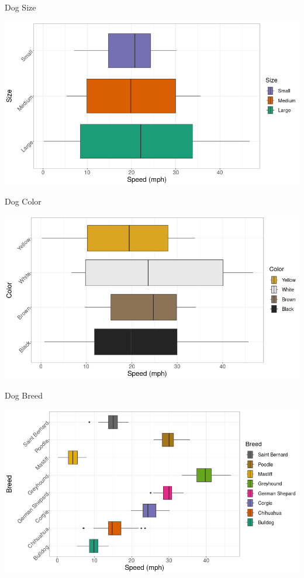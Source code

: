 \documentclass{beamer}
\begin{document}
\begin{frame}{Dog Size}
\begin{center}
\includegraphics[scale=0.4]{img/dog_size.png}
\end{center}


\end{frame}

\begin{frame}{Dog Color}
\begin{center}
\includegraphics[scale=0.4]{img/dog_color.png}
\end{center}

\end{frame}

\begin{frame}{Dog Breed}
\begin{center}
\includegraphics[scale=0.4]{img/dog_breed.png}
\end{center}

\end{frame}
\end{document}
